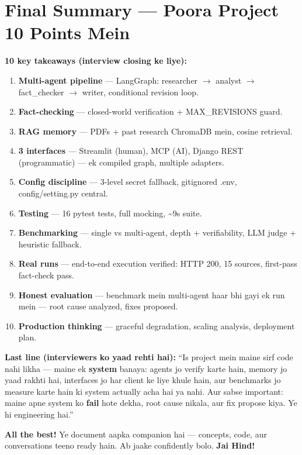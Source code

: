 \section{Final Summary --- Poora Project 10 Points Mein}

\begin{designbox}
\textbf{10 key takeaways (interview closing ke liye):}
\begin{enumerate}[label=\arabic*.]
\item \textbf{Multi-agent pipeline} --- LangGraph: researcher $\rightarrow$ analyst $\rightarrow$ fact\_checker $\rightarrow$ writer, conditional revision loop.
\item \textbf{Fact-checking} --- closed-world verification + MAX\_REVISIONS guard.
\item \textbf{RAG memory} --- PDFs + past research ChromaDB mein, cosine retrieval.
\item \textbf{3 interfaces} --- Streamlit (human), MCP (AI), Django REST (programmatic) --- ek compiled graph, multiple adapters.
\item \textbf{Config discipline} --- 3-level secret fallback, gitignored .env, config/setting.py central.
\item \textbf{Testing} --- 16 pytest tests, full mocking, \textasciitilde9s suite.
\item \textbf{Benchmarking} --- single vs multi-agent, depth + verifiability, LLM judge + heuristic fallback.
\item \textbf{Real runs} --- end-to-end execution verified: HTTP 200, 15 sources, first-pass fact-check pass.
\item \textbf{Honest evaluation} --- benchmark mein multi-agent haar bhi gayi ek run mein --- root cause analyzed, fixes proposed.
\item \textbf{Production thinking} --- graceful degradation, scaling analysis, deployment plan.
\end{enumerate}
\end{designbox}

\begin{storybox}
\textbf{Last line (interviewers ko yaad rehti hai):}
``Is project mein maine sirf code nahi likha --- maine ek \textbf{system} banaya: agents jo verify karte hain, memory jo yaad rakhti hai, interfaces jo har client ke liye khule hain, aur benchmarks jo measure karte hain ki system actually acha hai ya nahi. Aur sabse important: maine apne system ko \textbf{fail} hote dekha, root cause nikala, aur fix propose kiya. Ye hi engineering hai.''

\textbf{All the best!} Ye document aapka companion hai --- concepts, code, aur conversations teeno ready hain. Ab jaake confidently bolo. \textbf{Jai Hind!} \faThumbsUp
\end{storybox}

